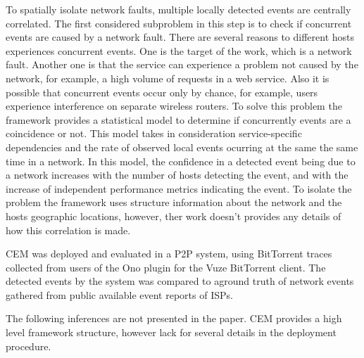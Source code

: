 To spatially isolate network faults, multiple locally detected events are
centrally correlated.
The first considered subproblem in this step is to check if concurrent events
are caused by a
network fault. There are several reasons to different hosts experiences
concurrent events. One is the target of the work, which is a network fault.
Another one is that the service can experience a problem not caused by the
network, for example, a high volume of requests in a web service. Also it is
possible that concurrent events occur only by chance, for example, users
experience interference on separate wireless routers. To solve this problem the
framework provides a statistical model to determine if
concurrently events are a coincidence or not. This model takes in
consideration service-specific dependencies and the rate of observed local
events ocurring at the same the same time in a network. In this model, the
confidence in a detected event being due to a network increases with the
number of hosts detecting the event, and with the increase of independent
performance metrics indicating the event. To isolate the problem the framework
uses structure information about the network and the hosts geographic
locations, however, ther work doesn't provides any details of how this
correlation is made.

CEM was deployed and evaluated in a P2P system, using BitTorrent traces collected
from users of the Ono plugin for the Vuze BitTorrent client. The detected
events by the system was compared to aground truth
of network events gathered from public available event reports of ISPs.

The following inferences are not presented in the paper.
CEM provides a high level framework structure, however lack for several details
in the deployment procedure.
